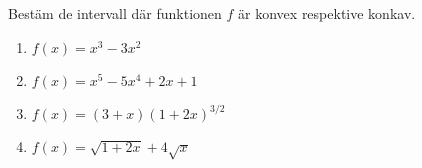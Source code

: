 

Bestäm de intervall där funktionen $f$ är konvex respektive konkav.
\begin{enumerate}
\item $ f(x) =  x^3-3x^2 $
\item $ f(x) =  x^5-5x^4+2x+1 $
\item $ f(x) =  (3+x)(1+2x)^{3/2} $
\item $ f(x) =  \sqrt{1+2x}+4\sqrt{x} $
\end{enumerate}